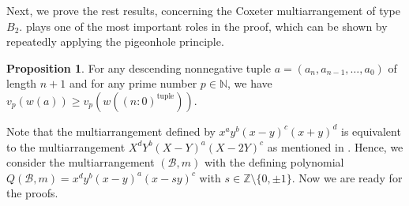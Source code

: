 \documentclass[12pt]{amsart}
\theoremstyle{definition}
\newtheorem{proposition}[definition]{Proposition}
\newcommand{\NN}{\mathbb{N}}
\newcommand{\ZZ}{\mathbb{Z}}
\newcommand{\BBB}{\mathcal{B}}
\newcommand{\tuple}[1]{({#1}:0)^{\text{tuple}}}
\newcommand{\blue}[1]{\textcolor{blue!80!black}{#1}}
\begin{document}
Next, we prove the rest %
results, concerning the Coxeter multiarrangement of type $B_2$. 
 plays one of the most important roles in the proof, 
which can be shown by 
repeatedly applying the pigeonhole principle. %
\begin{proposition}
\label{proposition:minimum_value}
For any descending nonnegative tuple $a=(a_n,a_{n-1},\ldots,a_0)$ %
of length $n+1$ 
and for any prime number $p\in\NN$, we have 
$v_p(w(a))\geq v_p(w(\tuple{n}))$. 
\end{proposition}

Note that the multiarrangement defined by $x^{a}y^{b}(x-y)^c(x+y)^d$ is equivalent to the multiarrangement $X^dY^b(X-Y)^a(X-2Y)^c$ as mentioned in . 
Hence, we consider the multiarrangement $(\BBB,m)$ with the defining polynomial $Q(\BBB,m)=x^dy^b(x-y)^a(x-sy)^c$ with $s\in\ZZ\setminus\{0,\pm1\}$. 
Now we are ready for the proofs. 
\end{document}
